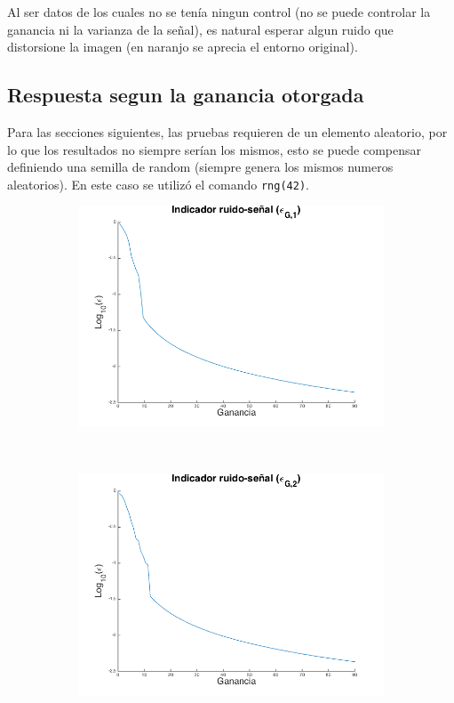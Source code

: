 \documentclass[letterpaper,11pt]{article}
\begin{document}
Al ser datos de los cuales no se tenía ningun control (no se puede controlar la ganancia ni la varianza de la señal), es natural esperar algun ruido que distorsione la imagen (en naranjo se aprecia el entorno original).   


\subsection{Respuesta segun la ganancia otorgada}

Para las secciones siguientes, las pruebas requieren de un elemento aleatorio, por lo que los resultados no siempre serían los mismos, esto se puede compensar definiendo una semilla de random (siempre genera los mismos numeros aleatorios). En este caso se utilizó el comando \texttt{rng(42)}.

\begin{figure}[H]
    \centering
        \begin{subfigure}[b]{0.45\textwidth}
        \includegraphics[width=\textwidth]{img/parte_c/curva1.png}
    \end{subfigure}
    ~
    \begin{subfigure}[b]{0.45\textwidth}
        \includegraphics[width=\textwidth]{img/parte_c/curva2.png}

\end{subfigure}
\end{figure}
\end{document}
